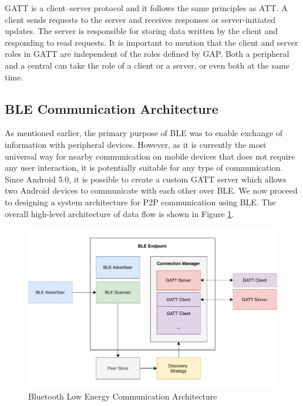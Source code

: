 GATT is a client–server protocol and it follows the same principles as ATT. A client sends requests to the server and receives responses or server-initiated updates. The server is responsible for storing data written by the client and responding to read requests. It is important to mention that the client and server roles in GATT are independent of the roles defined by GAP. Both a peripheral and a central can take the role of a client or a server, or even both at the same time.



\subsection{BLE Communication Architecture}

As mentioned earlier, the primary purpose of BLE was to enable exchange of information with peripheral devices. However, as it is currently the most universal way for nearby communication on mobile devices that does not require any user interaction, it is potentially suitable for any type of communication. Since Android 5.0, it is possible to create a custom GATT server which allows two Android devices to communicate with each other over BLE. We now proceed to designing a system architecture for P2P communication using BLE. The overall high-level architecture of data flow is shown in Figure \ref{ble_architecture}.

\begin{figure}
    \includegraphics[width=\textwidth]{diagrams/ipv8-ble-architecture}
    \caption{Bluetooth Low Energy Communication Architecture}
    \label{ble_architecture}
\end{figure}

